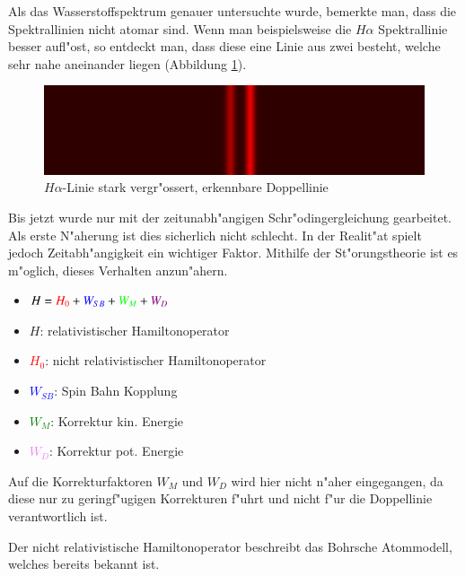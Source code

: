 \begin{refsection}
Als das Wasserstoffspektrum genauer untersuchte wurde, bemerkte man,
dass die Spektrallinien nicht atomar sind. Wenn man beispielsweise die
$H\alpha$ Spektrallinie besser aufl"ost, so entdeckt man, dass diese
eine Linie aus zwei besteht, welche sehr nahe aneinander
liegen (Abbildung \ref{atomuhr:fineStructure}).

\begin{figure}
	\centering
	\includegraphics[width = .6\columnwidth]{../vortrag/pictures/fine_structure_hydrogen.png}
	\caption{$H\alpha$-Linie stark vergr"ossert, erkennbare
          Doppellinie} %
        \label{atomuhr:fineStructure}
\end{figure}

Bis jetzt wurde nur mit der zeitunabh"angigen Schr"odingergleichung gearbeitet.
Als erste N"aherung ist dies sicherlich nicht schlecht.
In der Realit"at spielt jedoch Zeitabh"angigkeit ein wichtiger Faktor. 
Mithilfe der St"orungstheorie ist es m"oglich, dieses Verhalten anzun"ahern.

\begin{itemize}
	\item[]  $H = \textcolor{red}{H_0}+ \textcolor{blue}{W_{SB}} + 
		\textcolor{green}{W_M} + \textcolor{violet}{W_D} $
	\item[]  $H$: relativistischer Hamiltonoperator
	\item[]  \textcolor{red}{$H_0$}: nicht relativistischer Hamiltonoperator
	\item[]  \textcolor{blue}{$W_{SB}$}: Spin Bahn Kopplung
	\item[]  \textcolor{green}{$W_M$}: Korrektur kin. Energie
	\item[]  \textcolor{violet}{$W_D$}: Korrektur pot. Energie
	
\end{itemize}
		
Auf die Korrekturfaktoren $W_M$ und $W_D$ wird hier nicht n"aher
eingegangen, da diese nur zu geringf"ugigen Korrekturen f"uhrt und
nicht f"ur die Doppellinie verantwortlich ist.

Der nicht relativistische Hamiltonoperator beschreibt das Bohrsche
Atommodell, welches bereits bekannt ist.


\end{refsection}

